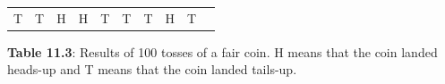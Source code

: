 {{\begin{center}
\begin{xtabular}[t]{|l|l|l|l|l|l|l|l|l|l|}
        T &
        T &
        H &
        H &
        T &
        T &
        T &
        H &
        T%
     \tabularnewline{}
    \end{xtabular}
      \end{center}
    \begin{center}{\small\bfseries Table 11.3}: Results of 100 tosses of a fair coin. H means that the coin
landed heads-up and T means that the coin landed tails-up.\end{center}
          } %
        }{%
        }
